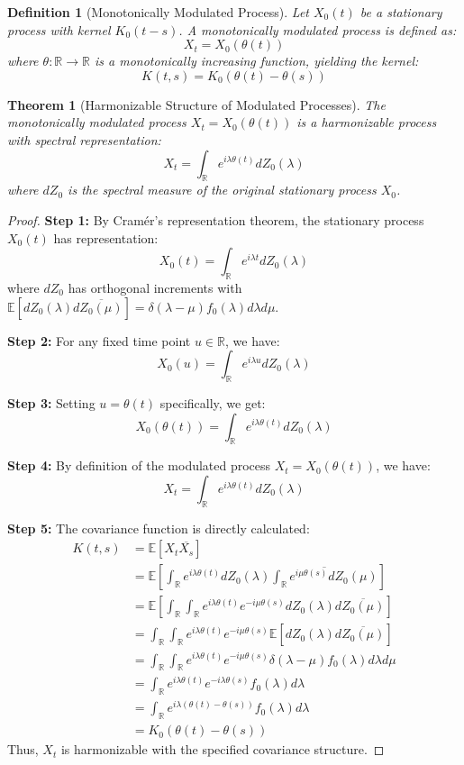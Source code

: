 \documentclass{article}
\newtheorem{theorem}{Theorem}
\newtheorem{definition}{Definition}
\begin{document}
\begin{definition}[Monotonically Modulated Process]
Let $X_0(t)$ be a stationary process with kernel $K_0(t-s)$. A monotonically modulated process is defined as:
$$X_t = X_0(\theta(t))$$
where $\theta: \mathbb{R} \to \mathbb{R}$ is a monotonically increasing function, yielding the kernel:
$$K(t,s) = K_0(\theta(t) - \theta(s))$$
\end{definition}

\begin{theorem}[Harmonizable Structure of Modulated Processes]
The monotonically modulated process $X_t = X_0(\theta(t))$ is a harmonizable process with spectral representation:
$$X_t = \int_{\mathbb{R}} e^{i\lambda\theta(t)} dZ_0(\lambda)$$
where $dZ_0$ is the spectral measure of the original stationary process $X_0$.
\end{theorem}

\begin{proof}
\textbf{Step 1:} By Cramér's representation theorem, the stationary process $X_0(t)$ has representation:
$$X_0(t) = \int_{\mathbb{R}} e^{i\lambda t}dZ_0(\lambda)$$
where $dZ_0$ has orthogonal increments with $\mathbb{E}[dZ_0(\lambda)d\overline{Z_0(\mu)}] = \delta(\lambda-\mu)f_0(\lambda)d\lambda d\mu$.

\textbf{Step 2:} For any fixed time point $u \in \mathbb{R}$, we have:
$$X_0(u) = \int_{\mathbb{R}} e^{i\lambda u}dZ_0(\lambda)$$

\textbf{Step 3:} Setting $u = \theta(t)$ specifically, we get:
$$X_0(\theta(t)) = \int_{\mathbb{R}} e^{i\lambda\theta(t)}dZ_0(\lambda)$$

\textbf{Step 4:} By definition of the modulated process $X_t = X_0(\theta(t))$, we have:
$$X_t = \int_{\mathbb{R}} e^{i\lambda\theta(t)}dZ_0(\lambda)$$

\textbf{Step 5:} The covariance function is directly calculated:
\begin{align*}
K(t,s) &= \mathbb{E}[X_t\overline{X_s}]\\
&= \mathbb{E}\left[\int_{\mathbb{R}} e^{i\lambda\theta(t)}dZ_0(\lambda) \overline{\int_{\mathbb{R}} e^{i\mu\theta(s)}dZ_0(\mu)}\right]\\
&= \mathbb{E}\left[\int_{\mathbb{R}}\int_{\mathbb{R}} e^{i\lambda\theta(t)}e^{-i\mu\theta(s)}dZ_0(\lambda)d\overline{Z_0(\mu)}\right]\\
&= \int_{\mathbb{R}}\int_{\mathbb{R}} e^{i\lambda\theta(t)}e^{-i\mu\theta(s)}\mathbb{E}[dZ_0(\lambda)d\overline{Z_0(\mu)}]\\
&= \int_{\mathbb{R}}\int_{\mathbb{R}} e^{i\lambda\theta(t)}e^{-i\mu\theta(s)}\delta(\lambda-\mu)f_0(\lambda)d\lambda d\mu\\
&= \int_{\mathbb{R}} e^{i\lambda\theta(t)}e^{-i\lambda\theta(s)}f_0(\lambda)d\lambda\\
&= \int_{\mathbb{R}} e^{i\lambda(\theta(t)-\theta(s))}f_0(\lambda)d\lambda\\
&= K_0(\theta(t)-\theta(s))
\end{align*}
Thus, $X_t$ is harmonizable with the specified covariance structure.
\end{proof}
\end{document}
